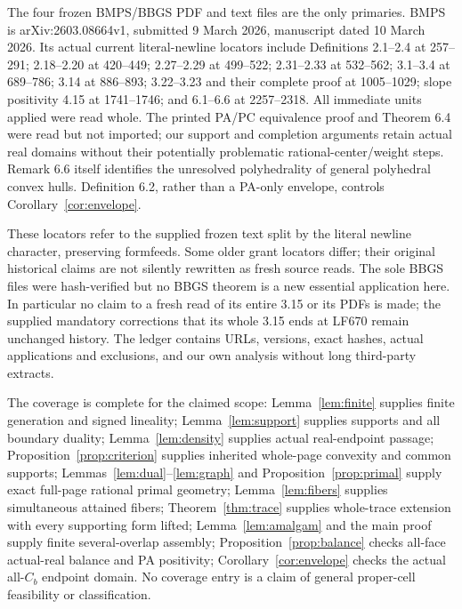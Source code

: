 \documentclass[11pt]{article}
\begin{document}
The four frozen BMPS/BBGS PDF and text files are the only primaries. BMPS is arXiv:2603.08664v1, submitted 9 March 2026, manuscript dated 10 March 2026. Its actual current literal-newline locators include Definitions 2.1--2.4 at 257--291; 2.18--2.20 at 420--449; 2.27--2.29 at 499--522; 2.31--2.33 at 532--562; 3.1--3.4 at 689--786; 3.14 at 886--893; 3.22--3.23 and their complete proof at 1005--1029; slope positivity 4.15 at 1741--1746; and 6.1--6.6 at 2257--2318. All immediate units applied were read whole. The printed PA/PC equivalence proof and Theorem 6.4 were read but not imported; our support and completion arguments retain actual real domains without their potentially problematic rational-center/weight steps. Remark 6.6 itself identifies the unresolved polyhedrality of general polyhedral convex hulls. Definition 6.2, rather than a PA-only envelope, controls Corollary~\ref{cor:envelope}.

These locators refer to the supplied frozen text split by the literal newline character, preserving formfeeds. Some older grant locators differ; their original historical claims are not silently rewritten as fresh source reads. The sole BBGS files were hash-verified but no BBGS theorem is a new essential application here. In particular no claim to a fresh read of its entire 3.15 or its PDFs is made; the supplied mandatory corrections that its whole 3.15 ends at LF670 remain unchanged history. The ledger contains URLs, versions, exact hashes, actual applications and exclusions, and our own analysis without long third-party extracts.

The coverage is complete for the claimed scope: Lemma~\ref{lem:finite} supplies finite generation and signed lineality; Lemma~\ref{lem:support} supplies supports and all boundary duality; Lemma~\ref{lem:density} supplies actual real-endpoint passage; Proposition~\ref{prop:criterion} supplies inherited whole-page convexity and common supports; Lemmas~\ref{lem:dual}--\ref{lem:graph} and Proposition~\ref{prop:primal} supply exact full-page rational primal geometry; Lemma~\ref{lem:fibers} supplies simultaneous attained fibers; Theorem~\ref{thm:trace} supplies whole-trace extension with every supporting form lifted; Lemma~\ref{lem:amalgam} and the main proof supply finite several-overlap assembly; Proposition~\ref{prop:balance} checks all-face actual-real balance and PA positivity; Corollary~\ref{cor:envelope} checks the actual all-$C_b$ endpoint domain. No coverage entry is a claim of general proper-cell feasibility or classification.
\end{document}
